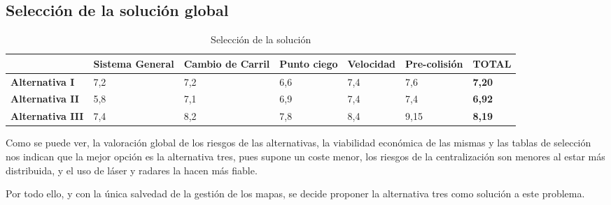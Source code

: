 \subsection{Selección de la solución global}
\begin{table}[H]
\begin{center}
\begin{tabular}{p{} p{} p{} p{} p{} p{} p{}}
 & \textbf{Sistema General} & \textbf{Cambio de Carril} & \textbf{Punto ciego} & \textbf{Velocidad} & \textbf{Pre-colisión} & \textbf{TOTAL} \\
\hline \hline
\textbf{Alternativa I} & 7,2 & 7,2 & 6,6 & 7,4 & 7,6 & \textbf{7,20}  \\
\hline
\textbf{Alternativa II} & 5,8 & 7,1 & 6,9 & 7,4 & 7,4 & \textbf{6,92}  \\
\hline
\textbf{Alternativa III} & 7,4 & 8,2 & 7,8 & 8,4 & 9,15 & \textbf{8,19} \\ \hline
\end{tabular}
\caption{Selección de la solución}
\label{tab:solucion}
\end{center}
\end{table}


\par Como se puede ver, la valoración global de los riesgos de las alternativas, la viabilidad económica de las mismas y las tablas de selección nos indican que la mejor opción es la alternativa tres, pues supone un coste menor, los riesgos de la centralización son menores al estar más distribuida, y el uso de láser y radares la hacen más fiable.

\par Por todo ello, y con la única salvedad de la gestión de los mapas, se decide proponer la alternativa tres como solución a este problema.
